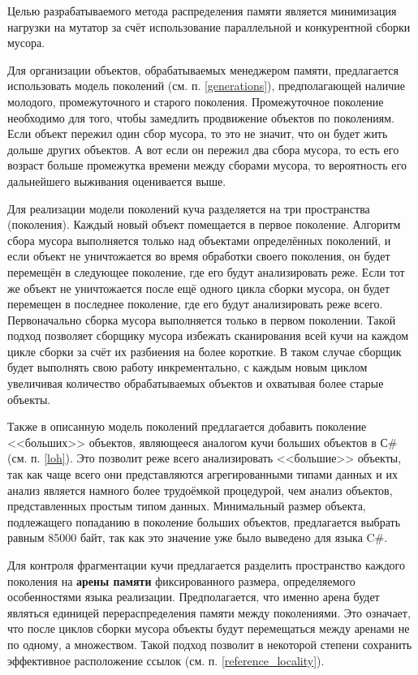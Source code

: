 Целью разрабатываемого метода распределения памяти является минимизация нагрузки на мутатор за счёт использование параллельной и конкурентной сборки мусора.

Для организации объектов, обрабатываемых менеджером памяти, предлагается использовать модель поколений (см. п. \ref{generations}), предполагающей наличие молодого, промежуточного и старого поколения. Промежуточное поколение необходимо для того, чтобы замедлить продвижение объектов по поколениям. Если объект пережил один сбор мусора, то это не значит, что он будет жить дольше других объектов. А вот если он пережил два сбора мусора, то есть его возраст больше промежутка времени между сборами мусора, то вероятность его дальнейшего выживания оценивается выше.

Для реализации модели поколений куча разделяется на три пространства (поколения). Каждый новый объект помещается в первое поколение. Алгоритм сбора мусора выполняется только над объектами определённых поколений, и если объект не уничтожается во время обработки своего поколения, он будет перемещён в следующее поколение, где его будут анализировать реже. Если тот же объект не уничтожается после ещё одного цикла сборки мусора, он будет перемещен в последнее поколение, где его будут анализировать реже всего. Первоначально сборка мусора выполняется только в первом поколении. Такой подход позволяет сборщику мусора избежать сканирования всей кучи на каждом цикле сборки за счёт их разбиения на более короткие. В таком случае сборщик будет выполнять свою работу инкрементально, с каждым новым циклом увеличивая количество обрабатываемых объектов и охватывая более старые объекты.

Также в описанную модель поколений предлагается добавить поколение <<больших>> объектов, являющееся аналогом кучи больших объектов в С\# (см. п. \ref{loh}). Это позволит реже всего анализировать <<большие>> объекты, так как чаще всего они представляются агрегированными типами данных и их анализ является намного более трудоёмкой процедурой, чем анализ объектов, представленных простым типом данных. Минимальный размер объекта, подлежащего попаданию в поколение больших объектов, предлагается выбрать равным 85000 байт, так как это значение уже было выведено для языка C\#.

Для контроля фрагментации кучи предлагается разделить пространство каждого поколения на \textbf{арены памяти} фиксированного размера, определяемого особенностями языка реализации. Предполагается, что именно арена будет являться единицей перераспределения памяти между поколениями. Это означает, что после циклов сборки мусора объекты будут перемещаться между аренами не по одному, а множеством. Такой подход позволит в некоторой степени сохранить эффективное расположение ссылок (см. п. \ref{reference_locality}).



